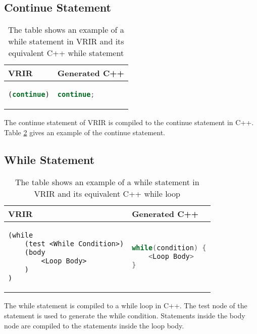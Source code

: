 \subsection{Continue Statement}
\begin{table}[htbp]
\centering
\begin{tabular}{|l|l|}
\hline

VRIR &  Generated C++ \\
\hline
{
\begin{lstlisting}[language=lisp,frame=none, numbers=none]
(continue)
\end{lstlisting}
}
&
{
\begin{lstlisting}[language=c,frame=none, numbers=none]
continue;
\end{lstlisting}
} \\
\hline
\end{tabular}
\caption[While statement example]{The table shows an example of a while statement in VRIR and its equivalent C++ while statement}
\label{tab:continueStmt}
\end{table}
The continue statement of VRIR is compiled to the continue statement in C++. Table \ref{tab:continueStmt} gives an example of the continue statement.
\subsection{While Statement}
\begin{table}[htbp]
\centering
\begin{tabular}{|l|l|}
\hline

VRIR &  Generated C++ \\
\hline
{
\begin{lstlisting}[language=lisp,frame=none, numbers=none]
(while 
	(test <While Condition>)
	(body 
		<Loop Body>
	)
)
\end{lstlisting}
}
&
{
\begin{lstlisting}[language=c,frame=none, numbers=none]
while(condition) {
	<Loop Body>
}
\end{lstlisting}
} \\
\hline
\end{tabular}
\caption[While statement example]{The table shows an example of a while statement in VRIR and its equivalent C++ while loop}
\label{tab:continueStmt}
\end{table}
The while statement is compiled to a while loop in C++. The test node of the statement is used to generate the while condition. Statements inside the body node are compiled to the statements inside the loop body.
